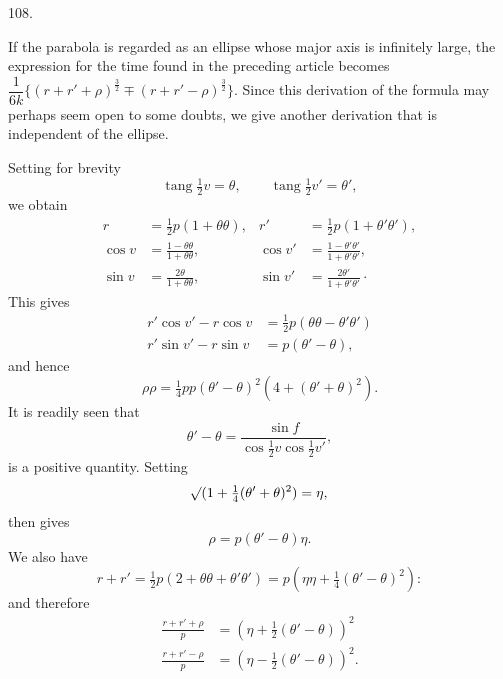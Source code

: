 \par{}\medskip
\hypertarget{native-149-article108}{}
\begin{center}108.\end{center}
If the parabola is regarded as an ellipse whose major axis is infinitely large, the expression for the time found in the preceding article becomes $\dfrac1{6k}\{(r+r'+\rho)^{\frac32}\mp(r+r'-\rho)^{\frac32}\}$. Since this derivation of the formula may perhaps seem open to some doubts, we give another derivation that is independent of the ellipse.
\par{}
Setting for brevity
\[
\operatorname{tang}\tfrac12v=\theta,\qquad\operatorname{tang}\tfrac12v'=\theta',
\]
\noindent we obtain
\[
\begin{aligned}
r&=\tfrac12p(1+\theta\theta),&r'&=\tfrac12p(1+\theta'\theta'),\\[.6em]
\cos v&=\frac{1-\theta\theta}{1+\theta\theta},&\cos v'&=\frac{1-\theta'\theta'}{1+\theta'\theta'},\\[.6em]
\sin v&=\frac{2\theta}{1+\theta\theta},&\sin v'&=\frac{2\theta'}{1+\theta'\theta'}\mathpunct{\cdot}
\end{aligned}
\]
\noindent This gives
\[
\begin{aligned}
r'\cos v'-r\cos v&=\tfrac12p(\theta\theta-\theta'\theta')\\[.6em]
r'\sin v'-r\sin v&=p(\theta'-\theta),
\end{aligned}
\]
\noindent and hence
\[
\rho\rho=\tfrac14pp(\theta'-\theta)^2(4+(\theta'+\theta)^2).
\]
\noindent It is readily seen that
\[
\theta'-\theta=\frac{\sin f}{\cos\tfrac12v\cos\tfrac12v'},
\]
\noindent is a positive quantity. Setting
\[
\mathord{{}^{}\!\surd}(1+\tfrac14(\theta'+\theta)^2)=\eta,
\]
\noindent then gives
\[
\rho=p(\theta'-\theta)\eta.
\]
\noindent We also have
\[
r+r'=\tfrac12p(2+\theta\theta+\theta'\theta')=p(\eta\eta+\tfrac14(\theta'-\theta)^2):
\]
\noindent and therefore
\[
\begin{aligned}
\frac{r+r'+\rho}{p}&=(\eta+\tfrac12(\theta'-\theta))^2\\[.6em]
\frac{r+r'-\rho}{p}&=(\eta-\tfrac12(\theta'-\theta))^2.
\end{aligned}
\]
